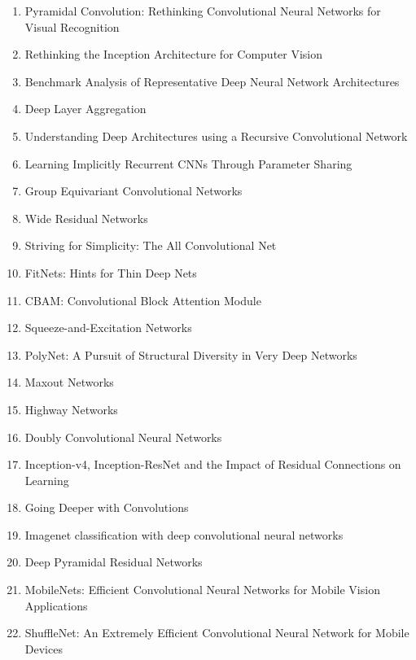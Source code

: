 \documentclass[acmlarge]{acmart}
\begin{document}
\begin{enumerate}
	\item Pyramidal Convolution: Rethinking Convolutional Neural Networks for Visual Recognition \cite{duta2020pyramidal}
	\item Rethinking the Inception Architecture for Computer Vision \cite{szegedy2015rethinking}
	\item Benchmark Analysis of Representative Deep Neural Network Architectures \cite{Bianco_2018}
	\item Deep Layer Aggregation \cite{yu2017deep}
	\item Understanding Deep Architectures using a Recursive Convolutional Network \cite{eigen2013understanding}
	\item Learning Implicitly Recurrent CNNs Through Parameter Sharing \cite{savarese2019learning}
	\item Group Equivariant Convolutional Networks \cite{cohen2016group}
	\item Wide Residual Networks \cite{zagoruyko2016wide}
	\item Striving for Simplicity: The All Convolutional Net \cite{springenberg2014striving}
	\item FitNets: Hints for Thin Deep Nets \cite{romero2014fitnets}
	\item CBAM: Convolutional Block Attention Module \cite{woo2018cbam}
	\item Squeeze-and-Excitation Networks \cite{hu2017squeezeandexcitation}
	\item PolyNet: A Pursuit of Structural Diversity in Very Deep Networks \cite{zhang2016polynet}
	\item Maxout Networks \cite{goodfellow2013maxout}
	\item Highway Networks \cite{srivastava2015highway}
	\item Doubly Convolutional Neural Networks \cite{zhai2016doubly}
	\item Inception-v4, Inception-ResNet and the Impact of Residual Connections on Learning \cite{szegedy2016inceptionv4}
	\item Going Deeper with Convolutions \cite{szegedy2014going}
	\item Imagenet classification with deep convolutional neural networks \cite{Krizhevsky_imagenetclassification}
	\item Deep Pyramidal Residual Networks \cite{han2016deep}
	\item MobileNets: Efficient Convolutional Neural Networks for Mobile Vision Applications \cite{howard2017mobilenets}
	\item ShuffleNet: An Extremely Efficient Convolutional Neural Network for Mobile Devices \cite{zhang2017shufflenet}

\end{enumerate}
\end{document}
